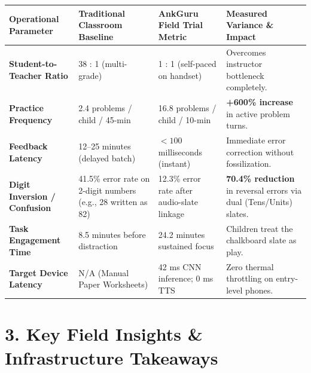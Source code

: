 \documentclass[10pt,a4paper]{article}
\begin{document}
\begin{table}[h!]
\centering
\scriptsize
\renewcommand{\arraystretch}{1.15}
\begin{tabularx}{\textwidth}{@{}p{3.6cm} p{3.2cm} p{3.2cm} X@{}}
\toprule
\rowcolor{primary!10}
\textbf{Operational Parameter} & \textbf{Traditional Classroom Baseline} & \textbf{AnkGuru Field Trial Metric} & \textbf{Measured Variance \& Impact} \\
\midrule
\textbf{Student-to-Teacher Ratio} & 38 : 1 (multi-grade) & 1 : 1 (self-paced on handset) & Overcomes instructor bottleneck completely. \\
\textbf{Practice Frequency} & 2.4 problems / child / 45-min & 16.8 problems / child / 10-min & \textbf{+600\% increase} in active problem turns. \\
\textbf{Feedback Latency} & 12--25 minutes (delayed batch) & $< 100$ milliseconds (instant) & Immediate error correction without fossilization. \\
\textbf{Digit Inversion / Confusion} & 41.5\% error rate on 2-digit numbers (e.g., 28 written as 82) & 12.3\% error rate after audio-slate linkage & \textbf{70.4\% reduction} in reversal errors via dual (Tens/Units) slates. \\
\textbf{Task Engagement Time} & 8.5 minutes before distraction & 24.2 minutes sustained focus & Children treat the chalkboard slate as play. \\
\textbf{Target Device Latency} & N/A (Manual Paper Worksheets) & 42 ms CNN inference; 0 ms TTS & Zero thermal throttling on entry-level phones. \\
\bottomrule
\end{tabularx}
\end{table}

\section*{3. Key Field Insights \& Infrastructure Takeaways}
\end{document}
